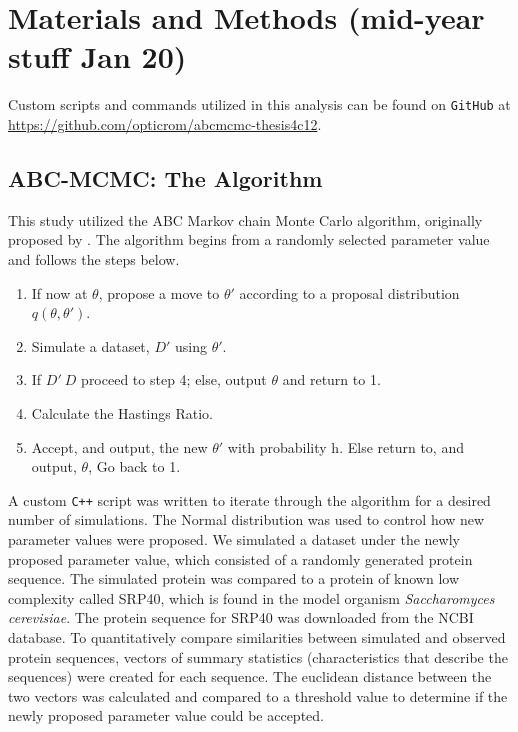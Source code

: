 \documentclass{article}
\newcommand{\sclong}{\textit{Saccharomyces cerevisiae}\xspace}
\begin{document}

\section{Materials and Methods (mid-year stuff Jan 20)} 
\label{methods}
Custom scripts and commands utilized in this analysis can be found on \texttt{GitHub} at
\url{https://github.com/opticrom/abcmcmc-thesis4c12}.


\subsection{ABC-MCMC: The Algorithm}

This study utilized the ABC Markov chain Monte Carlo algorithm, originally proposed by \citet{marjoram2003markov}. The algorithm begins from a randomly selected parameter value and follows the steps below.

	\begin{enumerate}
		\item If now at $\theta$, propose a move to $\theta'$ according to a proposal distribution $q(\theta, \theta')$.
		\item Simulate a dataset, $D'$ using $\theta'$.
		\item If $D' ~ D$ proceed to step 4; else, output $\theta$ and return to 1.
		\item Calculate the Hastings Ratio.
		\item Accept, and output, the new $\theta'$ with probability h. Else return to, and output, $\theta$, Go back to 1.
	\end{enumerate}

A custom \texttt{C++} script was written to iterate through the algorithm for a desired number of simulations. The Normal distribution was used to control how new parameter values were proposed. We simulated a dataset under the newly proposed parameter value, which consisted of a randomly generated protein sequence. The simulated protein was compared to a protein of known low complexity called SRP40, which is found in the model organism \sclong. The protein sequence for SRP40 was downloaded from the NCBI database. To quantitatively compare similarities between simulated and observed protein sequences, vectors of summary statistics (characteristics that describe the sequences) were created for each sequence. The euclidean distance between the two vectors was calculated and compared to a threshold value to determine if the newly proposed parameter value could be accepted.
\end{document}
